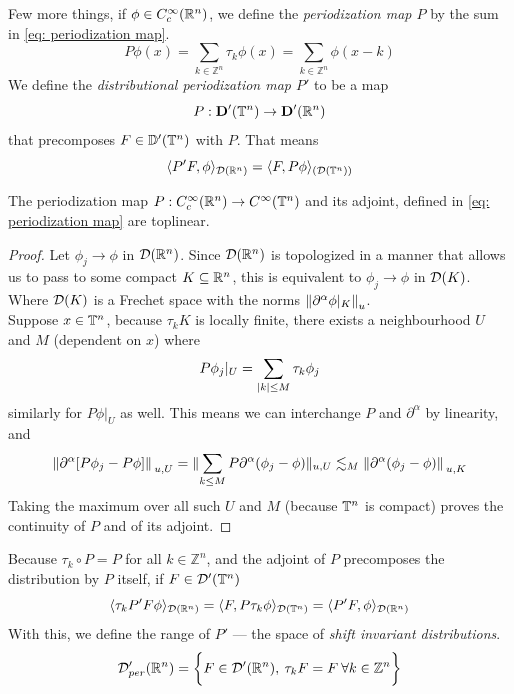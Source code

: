 \documentclass[../main-v2-manifolds.tex]{subfiles}
\begin{document}
Few more things, if $\phi\in C_c^\infty({\mathbb{R}^n})$, we define the \emph{periodization map $P$} by the sum in \cref{eq: periodization map}. 
\begin{equation}
P\phi(x) = \sum_{k\in\mathbb{Z}^n}\tau_k\phi(x) = \sum_{k\in\mathbb{Z}^n}\phi(x-k)
\label{eq: periodization map}
\end{equation}
We define the \emph{distributional periodization map $P'$} to be a map
\[
P: \mathbf{D}'({\mathbb{T}^n})\to \mathbf{D}'({\mathbb{R}^n})
\]
that precomposes $F\in \mathbb{D}'({\mathbb{T}^n})$ with $P$. That means
\[
\langle P'F,\phi \rangle_{\mathcal{D}({\mathbb{R}^n})} = \langle F, P\phi\rangle_{(\mathcal{D}({\mathbb{T}^n}))}
\]
\begin{wts}[Exercise 9.22]\label{thm: exercise 9.22 Folland Periodization}
    The periodization map $P: C_c^\infty({\mathbb{R}^n})\to C^\infty({\mathbb{T}^n})$ and its adjoint, defined in \cref{eq: periodization map} are toplinear.
\end{wts}
\begin{proof}
    Let $\phi_j\to \phi$ in $\mathcal{D}({\mathbb{R}^n})$. Since $\mathcal{D}({\mathbb{R}^n})$ is topologized in a manner that allows us to pass to some compact $K\subseteq{\mathbb{R}^n}$, this is equivalent to $\phi_j\to \phi$ in $\mathcal{D}(K)$. Where $\mathcal{D}(K)$ is a Frechet space with the norms $\norm{\partial^\alpha \phi\vert_{K}}_u$. \\

    Suppose $x\in {\mathbb{T}^n}$, because $\tau_k K$ is locally finite, there exists a neighbourhood $U$ and $M$ (dependent on $x$) where
    \[
        P\phi_j\vert_{U} = \sum_{\vert {k} \vert\leq M} \tau_k\phi_j
    \]
    similarly for $P\phi\vert_U$ as well. This means we can interchange $P$  and $\partial^\alpha$ by linearity, and 
    \[
        \norm*{\partial^\alpha[P\phi_j - P\phi]}_{u,U} = \lVert\sum_{k\leq M} P\partial^\alpha (\phi_j - \phi)\rVert_{u,U}\lesssim_M \norm*{\partial^\alpha(\phi_j - \phi)}_{u,K}
    \]
    Taking the maximum over all such $U$ and $M$ (because ${\mathbb{T}^n}$ is compact) proves the continuity of $P$ and of its adjoint. 
\end{proof}
Because $\tau_k\circ P = P$ for all $k\in\mathbb{Z}^n$, and the adjoint of $P$ precomposes the distribution by $P$ itself, if $F\in \mathcal{D}'({\mathbb{T}^n})$
\[
    \langle{\tau_k P'F}{\phi}\rangle_{\mathcal{D}({\mathbb{R}^n})}=\langle F, P\tau_k\phi\rangle_{\mathcal{D}({\mathbb{T}^n})} = \langle P'F, \phi\rangle_{\mathcal{D}({\mathbb{R}^n})}
\]
With this, we define the range of $P'$ --- the space of \emph{shift invariant distributions}.
\begin{equation}
\mathcal{D}'_{per}({\mathbb{R}^n}) = \biggl\{{F\in\mathcal{D}'({\mathbb{R}^n}),\: \tau_kF = F\: \forall k\in\mathbb{Z}^n}\biggr\}
\label{eq: shift-invariant distributions}
\end{equation}
\end{document}
